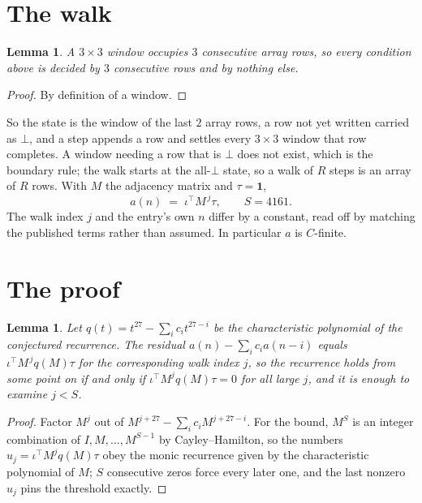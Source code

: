 \documentclass[11pt,a4paper]{article}
\theoremstyle{plain}
\newtheorem{lemma}[theorem]{Lemma}
\theoremstyle{definition}
\begin{document}
\section{The walk}

\begin{lemma}\label{lem:win}
A $3\times3$ window occupies $3$ consecutive array rows, so every condition above is
decided by $3$ consecutive rows and by nothing else.
\end{lemma}

\begin{proof}
By definition of a window.
\end{proof}

So the state is the window of the last $2$ array rows, a row not yet written carried as
$\bot$, and a step appends a row and settles every $3\times3$ window that row completes. A
window needing a row that is $\bot$ does not exist, which is the boundary rule; the walk starts
at the all-$\bot$ state, so a walk of $R$ steps is an array of $R$ rows. With $M$ the adjacency
matrix and $\tau=\mathbf{1}$,
\[
a(n)\;=\;\iota^{\!\top}M^{\,j}\tau ,\qquad S=4161.
\]
The walk index $j$ and the entry's own $n$ differ by a constant, read off by matching the
published terms rather than assumed. In particular $a$ is $C$-finite.

\section{The proof}

\begin{lemma}\label{lem:crit}
Let $q(t)=t^{27}-\sum_i c_it^{27-i}$ be the characteristic polynomial of the
conjectured recurrence. The residual $a(n)-\sum_ic_ia(n-i)$ equals
$\iota^{\!\top}M^{\,j}q(M)\tau$ for the corresponding walk index $j$, so the recurrence
holds from some point on if and only if $\iota^{\!\top}M^{j}q(M)\tau=0$ for all large $j$,
and it is enough to examine $j<S$.
\end{lemma}

\begin{proof}
Factor $M^{j}$ out of $M^{j+27}-\sum_ic_iM^{j+27-i}$. For the bound, $M^{S}$
is an integer combination of $I,M,\dots,M^{S-1}$ by Cayley--Hamilton, so the numbers
$u_j=\iota^{\!\top}M^{j}q(M)\tau$ obey the monic recurrence given by the characteristic
polynomial of $M$; $S$ consecutive zeros force every later one, and the last nonzero $u_j$
pins the threshold exactly.
\end{proof}
\end{document}
